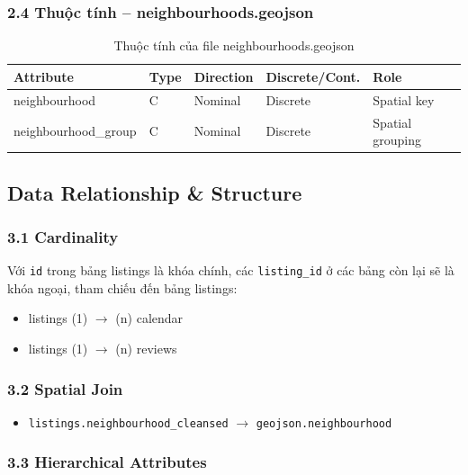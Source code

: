 \subsubsection*{2.4 Thuộc tính -- neighbourhoods.geojson}

\begin{table}[htbp]
\centering
\caption{Thuộc tính của file neighbourhoods.geojson}
\begin{tabular}{@{} l l l l l @{}}
\toprule
\textbf{Attribute} & \textbf{Type} & \textbf{Direction} & \textbf{Discrete/Cont.} & \textbf{Role} \\
\midrule
neighbourhood       & C & Nominal & Discrete & Spatial key \\ \hline
neighbourhood\_group & C & Nominal & Discrete & Spatial grouping \\ 
\bottomrule
\end{tabular}
\end{table}

\subsection{Data Relationship \& Structure}

\subsubsection*{3.1 Cardinality}

Với \texttt{id} trong bảng listings là khóa chính, các \texttt{listing\_id} ở các bảng còn lại sẽ là khóa ngoại, tham chiếu đến bảng listings:

\begin{itemize}
    \item listings (1) $\rightarrow$ (n) calendar
    \item listings (1) $\rightarrow$ (n) reviews
\end{itemize}

\subsubsection*{3.2 Spatial Join}

\begin{itemize}
    \item \texttt{listings.neighbourhood\_cleansed} $\rightarrow$ \texttt{geojson.neighbourhood}
\end{itemize}

\subsubsection*{3.3 Hierarchical Attributes}

